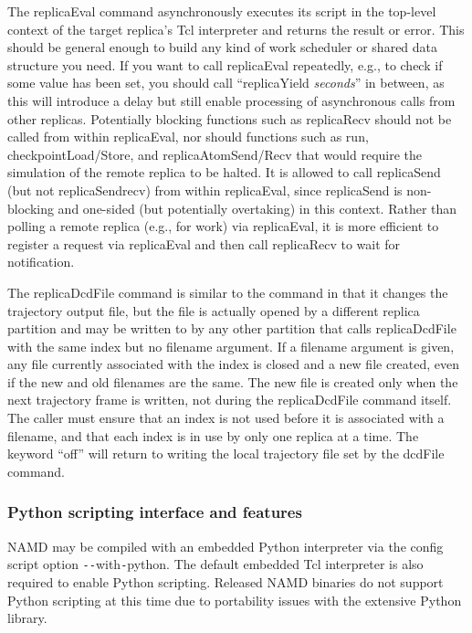 The replicaEval command asynchronously executes its script in the top-level context
of the target replica's Tcl interpreter and returns the result or error.
This should be general enough to build any kind of work scheduler or shared data structure you need.
If you want to call replicaEval repeatedly, e.g., to check if some value has been set,
you should call ``replicaYield {\em seconds}'' in between, as this will introduce a delay but
still enable processing of asynchronous calls from other replicas.
Potentially blocking functions such as replicaRecv should not be called from within replicaEval,
nor should functions such as run, checkpointLoad/Store, and replicaAtomSend/Recv that would
require the simulation of the remote replica to be halted.
It is allowed to call replicaSend (but not replicaSendrecv) from within replicaEval, since
replicaSend is non-blocking and one-sided (but potentially overtaking) in this context.
Rather than polling a remote replica (e.g., for work) via replicaEval, it is more efficient
to register a request via replicaEval and then call replicaRecv to wait for notification.

The replicaDcdFile command is similar to the  command in that it changes the
trajectory output file, but the file is actually opened by a different replica partition
and may be written to by any other partition that calls replicaDcdFile with the same index
but no filename argument.  If a filename argument is given, any file currently associated
with the index is closed and a new file created, even if the new and old filenames are the same.
The new file is created only when the next trajectory frame is written,
not during the replicaDcdFile command itself.
The caller must ensure that an index is not used before it is associated with a filename,
and that each index is in use by only one replica at a time.
The keyword ``off'' will return to writing the local trajectory file set by the dcdFile command.


\subsubsection{Python scripting interface and features}
\label{section:tclscripting}

NAMD may be compiled with an embedded Python interpreter
via the config script option \verb$--$with\verb$-$python.
The default embedded Tcl interpreter is also required to enable Python scripting.
Released NAMD binaries do not support Python scripting at this time
due to portability issues with the extensive Python library.

